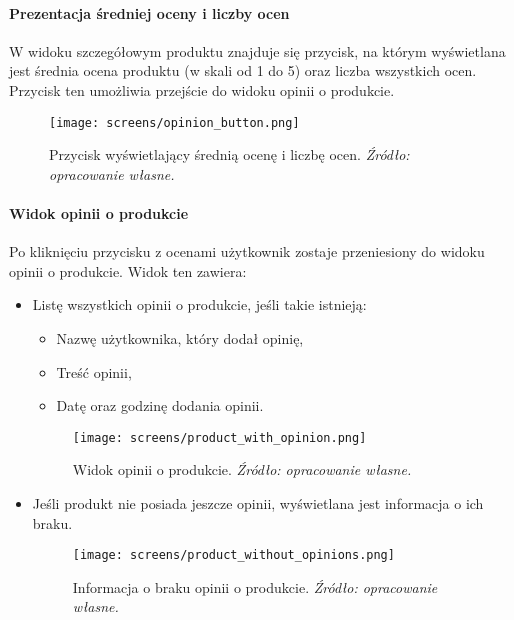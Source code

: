 \documentclass[12pt,a4paper,oneside]{article}
\theoremstyle{definition}
\numberwithin{equation}{section}
\begin{document}
\paragraph{Prezentacja średniej oceny i liczby ocen}
W widoku szczegółowym produktu znajduje się przycisk, na którym wyświetlana jest średnia ocena produktu (w skali od 1 do 5) oraz liczba wszystkich ocen. Przycisk ten umożliwia przejście do widoku opinii o produkcie.

\begin{figure}[H]
    \centering
    \texttt{[image: screens/opinion\_button.png]}
    \caption{Przycisk wyświetlający średnią ocenę i liczbę ocen. \emph{Źródło: opracowanie własne.}}
    \label{fig:rating_button}
\end{figure}

\paragraph{Widok opinii o produkcie}
Po kliknięciu przycisku z ocenami użytkownik zostaje przeniesiony do widoku opinii o produkcie. Widok ten zawiera:
\begin{itemize}
    \item Listę wszystkich opinii o produkcie, jeśli takie istnieją:
    \begin{itemize}
        \item Nazwę użytkownika, który dodał opinię,
        \item Treść opinii,
        \item Datę oraz godzinę dodania opinii.
    \end{itemize}
    \begin{figure}[H]
        \centering
        \texttt{[image: screens/product\_with\_opinion.png]}
        \caption{Widok opinii o produkcie. \emph{Źródło: opracowanie własne.}}
        \label{fig:review_list}
    \end{figure}
    \item Jeśli produkt nie posiada jeszcze opinii, wyświetlana jest informacja o ich braku.
    \begin{figure}[H]
        \centering
        \texttt{[image: screens/product\_without\_opinions.png]}
        \caption{Informacja o braku opinii o produkcie. \emph{Źródło: opracowanie własne.}}
        \label{fig:no_reviews}
    \end{figure}
    
\end{itemize}
\end{document}
